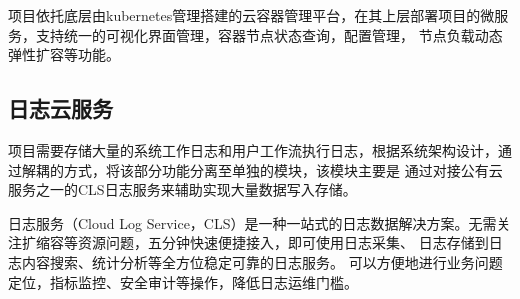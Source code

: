 项目依托底层由kubernetes管理搭建的云容器管理平台，在其上层部署项目的微服务，支持统一的可视化界面管理，容器节点状态查询，配置管理，
节点负载动态弹性扩容等功能\cite{Tuli_2022}。

\subsection{日志云服务}
项目需要存储大量的系统工作日志和用户工作流执行日志，根据系统架构设计，通过解耦的方式，将该部分功能分离至单独的模块，该模块主要是
通过对接公有云服务之一的CLS日志服务来辅助实现大量数据写入存储\cite{othe1}。

日志服务（Cloud Log Service，CLS）是一种一站式的日志数据解决方案。无需关注扩缩容等资源问题，五分钟快速便捷接入，即可使用日志采集、
日志存储到日志内容搜索、统计分析等全方位稳定可靠的日志服务。 可以方便地进行业务问题定位，指标监控、安全审计等操作，降低日志运维门槛。



%
%
%
%


%

